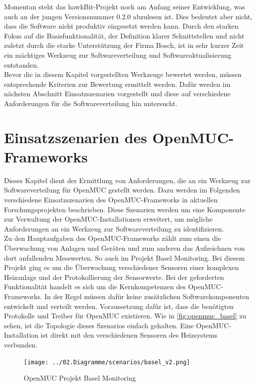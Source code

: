 Momentan steht das hawkBit-Projekt noch am Anfang seiner Entwicklung, was auch an der jungen Versionsnummer 0.2.0 abzulesen ist.
Dies bedeutet aber nicht, dass die Software nicht produktiv eingesetzt werden kann.
Durch den starken Fokus auf die Basisfunktionalität, der Definition klarer Schnittstellen und nicht zuletzt durch die starke Unterstützung der Firma Bosch,
ist in sehr kurzer Zeit ein mächtiges Werkzeug zur Softwareverteilung und Softwareaktualisierung entstanden.\\

Bevor die in diesem Kapitel vorgestellten Werkzeuge bewertet werden, müssen entsprechende Kriterien zur Bewertung ermittelt werden.
Dafür werden im nächsten Abschnitt Einsatzszenarien vorgestellt und diese auf verschiedene Anforderungen für die Softwareverteilung hin untersucht.

\section{Einsatzszenarien des OpenMUC-Frameworks}
\label{sec:openmuc_scenarios}

Dieses Kapitel dient der Ermittlung von Anforderungen, die an ein Werkzeug zur Softwareverteilung für OpenMUC gestellt werden.
Dazu werden im Folgenden verschiedene Einsatzszenarien des OpenMUC-Frameworks in aktuellen Forschungsprojekten beschrieben.
Diese Szenarien werden um eine Komponente zur Verwaltung der OpenMUC-Installationen erweitert,
um mögliche Anforderungen an ein Werkzeug zur Softwareverteilung zu identifizieren.\\

Zu den Hauptaufgaben des OpenMUC-Frameworks zählt zum einen die Überwachung von Anlagen und Geräten und zum anderen das Aufzeichnen von dort anfallenden Messwerten.
So auch im Projekt Basel Monitoring. Bei diesem Projekt ging es um die Überwachung verschiedener Sensoren einer komplexen Heizanlage und der Protokollierung der Sensorwerte.
Bei der geforderten Funktionalität handelt es sich um die Kernkompetenzen des OpenMUC-Frameworks.
In der Regel müssen dafür keine zusätzlichen Softwarekomponenten entwickelt und verteilt werden.
Voraussetzung dafür ist, dass die benötigten Protokolle und Treiber für OpenMUC existieren.
Wie in \autoref{fig:openmuc_basel} zu sehen, ist die Topologie dieses Szenarios einfach gehalten. Eine OpenMUC-Installation 
ist direkt mit den verschiedenen Sensoren des Heizsystems verbunden.

\begin{figure}[h]
 \centering
 \texttt{[image: ../02.Diagramme/scenarios/basel\_v2.png]}
 \caption{OpenMUC Projekt Basel Monitoring}
 \label{fig:openmuc_basel}
\end{figure}

